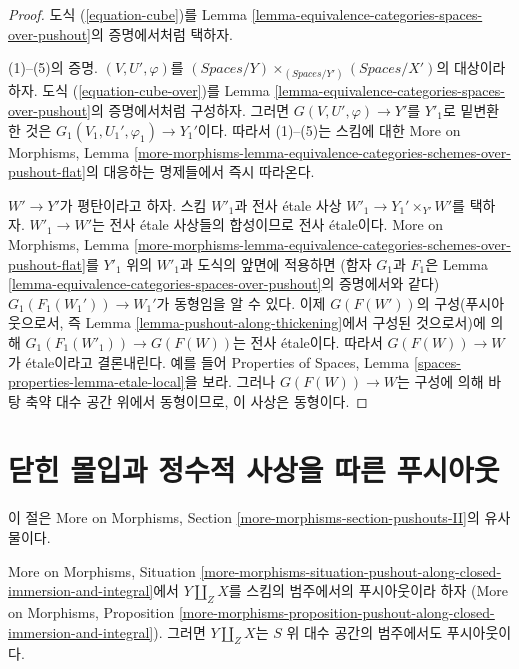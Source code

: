 \begin{proof}
도식 (\ref{equation-cube})를 Lemma
\ref{lemma-equivalence-categories-spaces-over-pushout}의 증명에서처럼 택하자.

\medskip\noindent
(1)--(5)의 증명. $(V, U', \varphi)$를
$(\textit{Spaces}/Y) \times_{(\textit{Spaces}/Y')} (\textit{Spaces}/X')$의
대상이라 하자. 도식 (\ref{equation-cube-over})를 Lemma
\ref{lemma-equivalence-categories-spaces-over-pushout}의 증명에서처럼 구성하자.
그러면 $G(V, U', \varphi) \to Y'$를 $Y'_1$로 밑변환한 것은
$G_1(V_1, U_1', \varphi_1) \to Y_1'$이다. 따라서 (1)--(5)는
스킴에 대한 More on Morphisms, Lemma
\ref{more-morphisms-lemma-equivalence-categories-schemes-over-pushout-flat}의
대응하는 명제들에서 즉시 따라온다.

\medskip\noindent
$W' \to Y'$가 평탄이라고 하자. 스킴 $W'_1$과 전사 \'etale 사상
$W'_1 \to Y_1' \times_{Y'} W'$를 택하자.
$W'_1 \to W'$는 전사 \'etale 사상들의 합성이므로 전사 \'etale이다.
More on Morphisms, Lemma
\ref{more-morphisms-lemma-equivalence-categories-schemes-over-pushout-flat}를
$Y'_1$ 위의 $W'_1$과 도식의 앞면에 적용하면
(함자 $G_1$과 $F_1$은 Lemma
\ref{lemma-equivalence-categories-spaces-over-pushout}의 증명에서와 같다)
$G_1(F_1(W_1')) \to W_1'$가 동형임을 알 수 있다.
이제 $G(F(W'))$의 구성(푸시아웃으로서, 즉 Lemma
\ref{lemma-pushout-along-thickening}에서 구성된 것으로서)에 의해
$G_1(F_1(W'_1)) \to G(F(W))$는 전사 \'etale이다.
따라서 $G(F(W)) \to W$가 \'etale이라고 결론내린다.
예를 들어 Properties of Spaces, Lemma
\ref{spaces-properties-lemma-etale-local}을 보라.
그러나 $G(F(W)) \to W$는 구성에 의해 바탕 축약 대수 공간 위에서
동형이므로, 이 사상은 동형이다.
\end{proof}

\section{닫힌 몰입과 정수적 사상을 따른 푸시아웃}
\label{section-pushouts-II}

\noindent
이 절은 More on Morphisms, Section
\ref{more-morphisms-section-pushouts-II}의 유사물이다.

\begin{lemma}
\label{lemma-pushout-along-closed-immersion-and-integral}
More on Morphisms, Situation
\ref{more-morphisms-situation-pushout-along-closed-immersion-and-integral}에서
$Y \amalg_Z X$를 스킴의 범주에서의 푸시아웃이라 하자
(More on Morphisms, Proposition
\ref{more-morphisms-proposition-pushout-along-closed-immersion-and-integral}).
그러면 $Y \amalg_Z X$는 $S$ 위 대수 공간의 범주에서도 푸시아웃이다.
\end{lemma}

